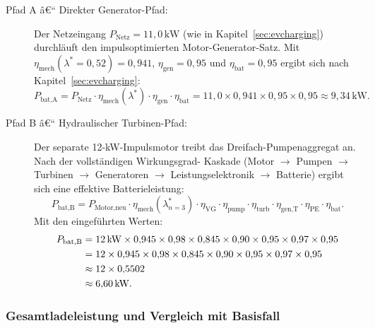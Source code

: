 ﻿\documentclass[a4paper,12pt]{article}
\begin{document}
\begin{description}
  \item[Pfad A â€“ Direkter Generator-Pfad:] Der Netzeingang
    $P_\text{Netz} = 11{,}0\,\text{kW}$ (wie in Kapitel~\ref{sec:evcharging})
    durchläuft den impulsoptimierten Motor-Generator-Satz. Mit
    $\eta_\text{mech}(\lambda^* = 0{,}52) = 0{,}941$,
    $\eta_\text{gen} = 0{,}95$ und $\eta_\text{bat} = 0{,}95$ ergibt sich
    nach Kapitel~\ref{sec:evcharging}:
    \begin{equation}
      P_\text{bat,A} = P_\text{Netz}
                       \cdot \eta_\text{mech}(\lambda^*)
                       \cdot \eta_\text{gen}
                       \cdot \eta_\text{bat}
                     = 11{,}0 \times 0{,}941 \times 0{,}95 \times 0{,}95
                     \approx 9{,}34\,\text{kW}.
      \label{eq:P_bat_A}
    \end{equation}

  \item[Pfad B â€“ Hydraulischer Turbinen-Pfad:] Der separate 12-kW-Impulsmotor
    treibt das Dreifach-Pumpenaggregat an. Nach der vollständigen Wirkungsgrad-
    Kaskade (Motor $\rightarrow$ Pumpen $\rightarrow$ Turbinen $\rightarrow$
    Generatoren $\rightarrow$ Leistungselektronik $\rightarrow$ Batterie) ergibt
    sich eine effektive Batterieleistung:
    \begin{equation}
      P_\text{bat,B}
        = P_\text{Motor,neu}
          \cdot \eta_\text{mech}(\lambda^*_{n=3})
          \cdot \eta_\text{VG}
          \cdot \eta_\text{pump}
          \cdot \eta_\text{turb}
          \cdot \eta_\text{gen,T}
          \cdot \eta_\text{PE}
          \cdot \eta_\text{bat}.
      \label{eq:P_bat_B_formel}
    \end{equation}
    Mit den eingeführten Werten:
    \begin{align}
      P_\text{bat,B}
        &= 12\,\text{kW} \times 0{,}945 \times 0{,}98
           \times 0{,}845 \times 0{,}90 \times 0{,}95
           \times 0{,}97 \times 0{,}95 \notag \\
        &= 12 \times 0{,}945 \times 0{,}98 \times 0{,}845
           \times 0{,}90 \times 0{,}95 \times 0{,}97 \times 0{,}95 \notag \\
        &\approx 12 \times 0{,}5502 \notag \\
        &\approx 6{,}60\,\text{kW}.
      \label{eq:P_bat_B}
    \end{align}
\end{description}

\subsubsection{Gesamtladeleistung und Vergleich mit Basisfall}
\end{document}
